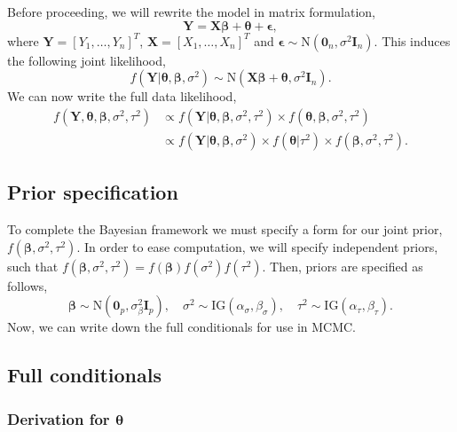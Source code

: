 \documentclass[12pt]{article} %
\theoremstyle{plain}
\theoremstyle{definition}
\theoremstyle{remark}
\begin{document}
Before proceeding, we will rewrite the model in matrix formulation,
$$\mathbf{Y}=\mathbf{X}\boldsymbol{\beta}+\boldsymbol{\theta}+\boldsymbol{\epsilon},$$
where $\mathbf{Y}=[Y_1,\ldots,Y_n]^T$, $\mathbf{X}=[X_1,\ldots,X_n]^T$ and $\boldsymbol{\epsilon}\sim \text{N}\left(\boldsymbol{0}_n,\sigma^2 \mathbf{I}_n\right)$. This induces the following joint likelihood,
$$f\left(\mathbf{Y}|\boldsymbol{\theta},\boldsymbol{\beta},\sigma^2\right) \sim \text{N}\left(\mathbf{X}\boldsymbol{\beta}+\boldsymbol{\theta},\sigma^2 \mathbf{I}_n\right).$$
We can now write the full data likelihood,
\begin{align*}
f\left(\mathbf{Y},\boldsymbol{\theta},\boldsymbol{\beta},\sigma^2,\tau^2\right) &\propto f\left(\mathbf{Y}|\boldsymbol{\theta},\boldsymbol{\beta},\sigma^2,\tau^2\right) \times f\left(\boldsymbol{\theta},\boldsymbol{\beta},\sigma^2,\tau^2\right)\\
&\propto f\left(\mathbf{Y}|\boldsymbol{\theta},\boldsymbol{\beta},\sigma^2\right) \times f\left(\boldsymbol{\theta}|\tau^2\right) \times f\left(\boldsymbol{\beta},\sigma^2,\tau^2\right).
\end{align*}

\subsection*{Prior specification}

To complete the Bayesian framework we must specify a form for our joint prior, $f\left(\boldsymbol{\beta},\sigma^2,\tau^2\right)$. In order to ease computation, we will specify independent priors, such that $f\left(\boldsymbol{\beta},\sigma^2,\tau^2\right)=f\left(\boldsymbol{\beta}\right)f\left(\sigma^2\right)f\left(\tau^2\right)$. Then, priors are specified as follows,
$$\boldsymbol{\beta} \sim \text{N}\left(\boldsymbol{0}_p,\sigma_{\beta}^2 \mathbf{I}_p\right),\quad \sigma^2 \sim \text{IG}\left(\alpha_{\sigma},\beta_{\sigma}\right),\quad \tau^2 \sim \text{IG}\left(\alpha_{\tau},\beta_{\tau}\right).$$
Now, we can write down the full conditionals for use in MCMC.

\subsection*{Full conditionals}

\subsubsection*{Derivation for $\boldsymbol{\theta}$}
\end{document}
